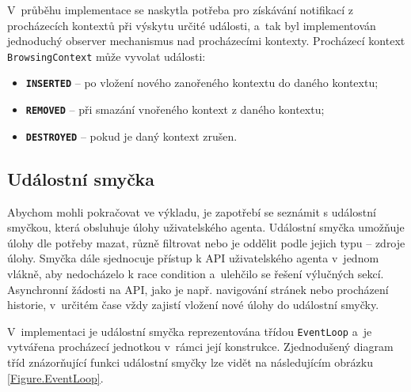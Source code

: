 V~průběhu implementace se naskytla potřeba pro získávání notifikací z procházecích kontextů při výskytu určité události, a~tak byl implementován jednoduchý observer mechanismus nad procházecími kontexty. Procházecí kontext \texttt{BrowsingContext} může vyvolat události:

\begin{itemize}
  \item \textbf{\texttt{INSERTED}} -- po vložení nového zanořeného kontextu do daného kontextu;
  \item \textbf{\texttt{REMOVED}} -- při smazání vnořeného kontext z daného kontextu;
  \item \textbf{\texttt{DESTROYED}} -- pokud je daný kontext zrušen. 
\end{itemize}

\subsection{Událostní smyčka}
\label{Chapter.Implementation.EventLoop}

Abychom mohli pokračovat ve výkladu, je zapotřebí se seznámit s událostní smyčkou, která obsluhuje úlohy uživatelského agenta. Událostní smyčka umožňuje úlohy dle potřeby mazat, různě filtrovat nebo je oddělit podle jejich typu -- zdroje úlohy. Smyčka dále sjednocuje přístup k API uživatelského agenta v~jednom vlákně, aby nedocházelo k race condition a~ulehčilo se řešení výlučných sekcí. Asynchronní žádosti na API, jako je např. navigování stránek nebo procházení historie, v~určitém čase vždy zajistí vložení nové úlohy do událostní smyčky.

V~implementaci je událostní smyčka reprezentována třídou \texttt{EventLoop} a~je vytvářena procházecí jednotkou v~rámci její konstrukce. Zjednodušený diagram tříd znázorňující funkci událostní smyčky lze vidět na následujícím obrázku \ref{Figure.EventLoop}. 

